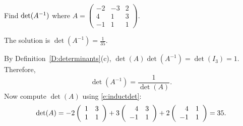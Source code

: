 \documentclass{ximera}
\begin{document}
\begin{exercise} \label{c10.1.2}
Find $\det(A^{-1})$ where 
$A = \left(\begin{array}{rrr} -2 & -3 & 2 \\ 4 & 1 & 3 \\ -1 & 1 & 1
\end{array} \right)$. 

\begin{solution}

\ans The solution is $\det(A^{-1}) = \frac{1}{35}$.

\soln By Definition~\ref{D:determinants}(c),
$\det(A)\det(A^{-1}) = \det(I_3) = 1$.  Therefore,
\[
\det(A^{-1}) = \frac{1}{\det(A)}.
\]
Now compute $\det(A)$ using \eqref{e:inductdet}:
\[
\det(A) = -2\left(\begin{array}{rr} 1 & 3\\ 1 &1\end{array}\right) + 3\left(\begin{array}{rr} 4 & 3\\ -1 &1\end{array}\right)
+ 2\left(\begin{array}{rr} 4 & 1\\ -1 &1\end{array}\right) = 35.
\]

\end{solution}
\end{exercise}
\end{document}
